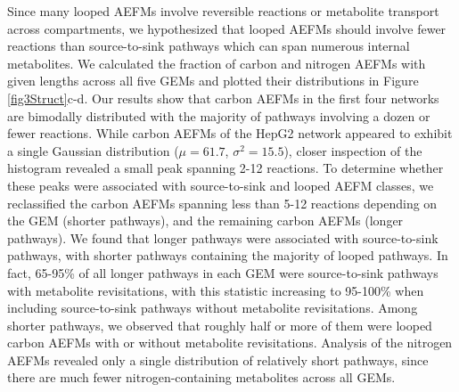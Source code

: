 \documentclass[12pt]{article}
\begin{document}
Since many looped AEFMs involve reversible reactions or metabolite
transport across compartments, we hypothesized that looped AEFMs should
involve fewer reactions than source-to-sink pathways which can span
numerous internal metabolites. We calculated the fraction of carbon and
nitrogen AEFMs with given lengths across all five GEMs and plotted their
distributions in Figure \ref{fig3Struct}c-d. Our results show that carbon
AEFMs in the first four networks are bimodally distributed with the
majority of pathways involving a dozen or fewer reactions. While carbon
AEFMs of the HepG2 network appeared to exhibit a single Gaussian
distribution ($\mu=61.7$, $\sigma^2=15.5$), closer inspection of the
histogram revealed a small peak spanning 2-12 reactions. To determine
whether these peaks were associated with source-to-sink and looped AEFM
classes, we reclassified the carbon AEFMs spanning less than 5-12
reactions depending on the GEM (shorter pathways), and the remaining
carbon AEFMs (longer pathways). We found that longer pathways were
associated with source-to-sink pathways, with shorter pathways containing
the majority of looped pathways. In fact, 65-95\% of all longer pathways
in each GEM were source-to-sink pathways with metabolite revisitations,
with this statistic increasing to 95-100\% when including source-to-sink
pathways without metabolite revisitations. Among shorter pathways, we
observed that roughly half or more of them were looped carbon AEFMs with
or without metabolite revisitations. Analysis of the nitrogen AEFMs
revealed only a single distribution of relatively short pathways, since
there are much fewer nitrogen-containing metabolites across all GEMs.
\end{document}
